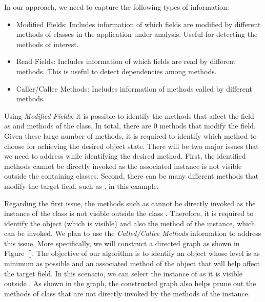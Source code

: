 In our approach, we need to capture the following types of information:

\begin{itemize}
\item Modified Fields: Includes information of which fields are modified by different methods of classes in the application under analysis. Useful for detecting the methods of interest.
\item Read Fields: Includes information of which fields are read by different methods. This is useful to detect dependencies among methods.
\item Caller/Callee Methods: Includes information of methods called by different methods.
\end{itemize}

Using \emph{Modified Fields}, it is possible to identify the methods that affect the  field as  and  methods of the  class. In total, there are $0$ methods that modify the  field. Given these large number of methods, it is required to identify which method to choose for achieving the desired object state. There will be two major issues that we need to address while identifying the desired method. First, the identified methods cannot be directly invoked as the associated instance is not visible outside the containing classes. Second, there can be many different methods that modify the target field, such as , in this example.

Regarding the first issue, the methods such as  cannot be directly invoked as the instance of the  class is not visible outside the class . Therefore, it is required to identify the object (which is visible) and also the method of the instance, which can be invoked. We plan to use the \emph{Called/Callee Methods} information to address this issue. More specifically, we will construct a directed graph as shown in Figure~\ref{}. The objective of our algorithm is to identify an object whose level is as minimum as possible and an associated method of the object that will help affect the target field. In this scenario, we can select the instance of  as it is visible outside . As shown in the graph, the constructed graph also helps prune out the methods of  class that are not directly invoked by the methods of the  instance.

